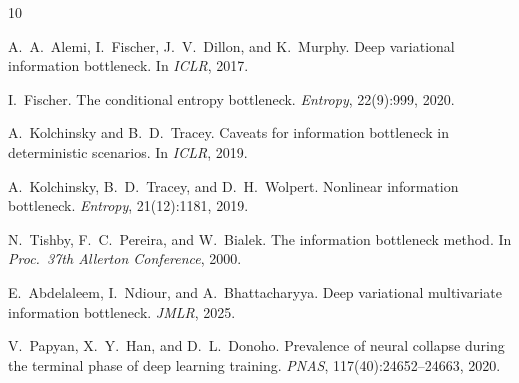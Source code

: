 \documentclass{article}
\theoremstyle{plain}
\theoremstyle{remark}
\begin{document}

\begin{thebibliography}{10}

A.~A.~Alemi, I.~Fischer, J.~V.~Dillon, and K.~Murphy.
\newblock Deep variational information bottleneck.
\newblock In \emph{ICLR}, 2017.

I.~Fischer.
\newblock The conditional entropy bottleneck.
\newblock \emph{Entropy}, 22(9):999, 2020.

A.~Kolchinsky and B.~D.~Tracey.
\newblock Caveats for information bottleneck in deterministic scenarios.
\newblock In \emph{ICLR}, 2019.

A.~Kolchinsky, B.~D.~Tracey, and D.~H.~Wolpert.
\newblock Nonlinear information bottleneck.
\newblock \emph{Entropy}, 21(12):1181, 2019.

N.~Tishby, F.~C.~Pereira, and W.~Bialek.
\newblock The information bottleneck method.
\newblock In \emph{Proc.\ 37th Allerton Conference}, 2000.

E.~Abdelaleem, I.~Ndiour, and A.~Bhattacharyya.
\newblock Deep variational multivariate information bottleneck.
\newblock \emph{JMLR}, 2025.

V.~Papyan, X.~Y.~Han, and D.~L.~Donoho.
\newblock Prevalence of neural collapse during the terminal phase of deep learning
training.
\newblock \emph{PNAS}, 117(40):24652--24663, 2020.

\end{thebibliography}
\end{document}
